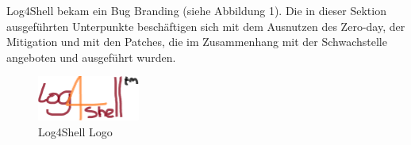 
Log4Shell bekam ein Bug Branding (siehe Abbildung 1).
Die in dieser Sektion ausgeführten Unterpunkte beschäftigen sich mit dem Ausnutzen des Zero-day, der Mitigation und mit den Patches, die im Zusammenhang mit der Schwachstelle angeboten und ausgeführt wurden.
\begin{figure}[!htb]\label{fig:log4shell-logo}
    \begin{center}
        \includegraphics[width=0.3\textwidth]{images/log4shell-logo}
    \end{center}
    \caption{Log4Shell Logo}
\end{figure}

